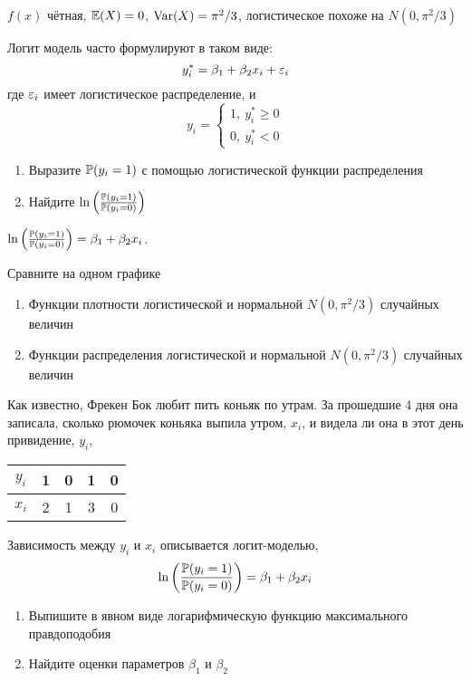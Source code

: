 \documentclass[pdftex,11pt,openany]{book}\usepackage[]{graphicx}\usepackage[]{color}
\begin{document}
\begin{solution}
$f(x)$ чётная, $\E(X)=0$, $\Var(X)=\pi^2/3$, логистическое похоже на $N(0,\pi^2/3)$
\end{solution}


\begin{problem}
Логит модель часто формулируют в таком виде:
\[
y_i^*=\beta_1+\beta_2 x_i +\e_i
\]
где $\e_i$ имеет логистическое распределение, и 
\[
y_i=\begin{cases}
1,\: y_i^*\geq 0 \\
0,\: y_i^*<0
\end{cases}
\]
\begin{enumerate}
\item Выразите $\P(y_i=1)$ с помощью логистической функции распределения 
\item Найдите $\ln \left(\frac{\P(y_i=1)}{\P(y_i=0)} \right)$
\end{enumerate}
\end{problem}

\begin{solution}
$\ln \left(\frac{\P(y_i=1)}{\P(y_i=0)} \right)=\beta_1+\beta_2 x_i$.
\end{solution}


\begin{problem}
\useR Сравните на одном графике
\begin{enumerate}
\item Функции плотности логистической и нормальной $N(0,\pi^2/3)$ случайных величин
\item Функции распределения логистической и нормальной $N(0,\pi^2/3)$ случайных величин
\end{enumerate}
\end{problem}
\begin{solution}
\end{solution}


\begin{problem}
Как известно, Фрекен Бок любит пить коньяк по утрам. За прошедшие 4 дня она записала, сколько рюмочек коньяка выпила утром, $x_i$, и видела ли она в этот день привидение, $y_i$, 

\begin{tabular}{c|cccc}
$y_i$ & 1 & 0 & 1 & 0 \\
\hline
$x_i$ & 2 & 1 & 3 & 0 
\end{tabular}  

Зависимость между $y_i$ и $x_i$ описывается логит-моделью, 
\[
\ln 
\left(
  \frac{\P(y_i=1)}{\P(y_i=0)}
\right)
=\beta_1+\beta_2 x_i
\]

\begin{enumerate}
\item Выпишите в явном виде логарифмическую функцию максимального правдоподобия
\item \useR Найдите оценки параметров $\beta_1$ и $\beta_2$
\end{enumerate}
\end{problem}
\begin{solution}
\end{solution}
\end{document}
